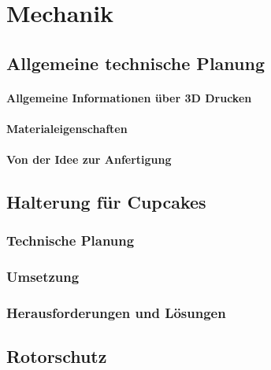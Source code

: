 \chapter{Mechanik}

\renewcommand{\kapitelautor}{Autor: Alexander Punz}

\section{Allgemeine technische Planung}
	
		\subsubsection{Allgemeine Informationen über 3D Drucken}

		\subsubsection{Materialeigenschaften}

		\subsubsection{Von der Idee zur Anfertigung}

\section{Halterung für Cupcakes}

	\subsection{Technische Planung}

	\subsection{Umsetzung}

	\subsection{Herausforderungen und Lösungen}


\section{Rotorschutz}

